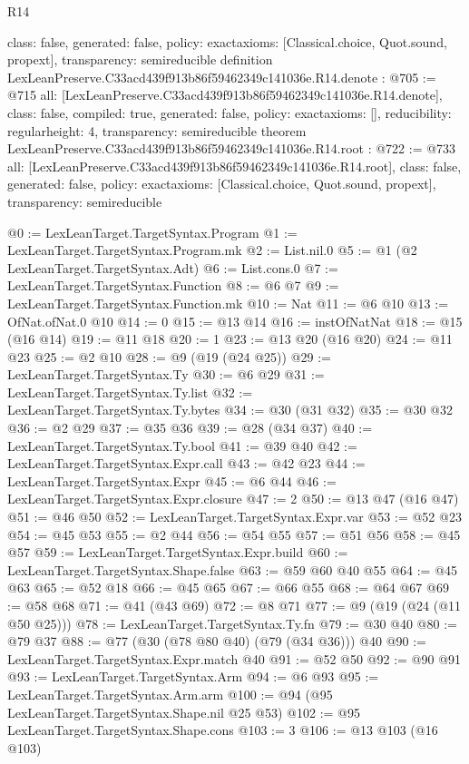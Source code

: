 \begin{lexlean}{R14}
\begin{coremodule}
{  class: false,
  generated: false,
  policy: exact{axioms: [Classical.choice, Quot.sound, propext]},
  transparency: semireducible
}
definition LexLeanPreserve.C33acd439f913b86f59462349c141036e.R14.denote : @705 := @715 {
  all: [LexLeanPreserve.C33acd439f913b86f59462349c141036e.R14.denote],
  class: false,
  compiled: true,
  generated: false,
  policy: exact{axioms: []},
  reducibility: regular{height: 4},
  transparency: semireducible
}
theorem LexLeanPreserve.C33acd439f913b86f59462349c141036e.R14.root : @722 := @733 {
  all: [LexLeanPreserve.C33acd439f913b86f59462349c141036e.R14.root],
  class: false,
  generated: false,
  policy: exact{axioms: [Classical.choice, Quot.sound, propext]},
  transparency: semireducible
}

@0 := LexLeanTarget.TargetSyntax.Program
@1 := LexLeanTarget.TargetSyntax.Program.mk
@2 := List.nil.{0}
@5 := @1 (@2 LexLeanTarget.TargetSyntax.Adt)
@6 := List.cons.{0}
@7 := LexLeanTarget.TargetSyntax.Function
@8 := @6 @7
@9 := LexLeanTarget.TargetSyntax.Function.mk
@10 := Nat
@11 := @6 @10
@13 := OfNat.ofNat.{0} @10
@14 := 0
@15 := @13 @14
@16 := instOfNatNat
@18 := @15 (@16 @14)
@19 := @11 @18
@20 := 1
@23 := @13 @20 (@16 @20)
@24 := @11 @23
@25 := @2 @10
@28 := @9 (@19 (@24 @25))
@29 := LexLeanTarget.TargetSyntax.Ty
@30 := @6 @29
@31 := LexLeanTarget.TargetSyntax.Ty.list
@32 := LexLeanTarget.TargetSyntax.Ty.bytes
@34 := @30 (@31 @32)
@35 := @30 @32
@36 := @2 @29
@37 := @35 @36
@39 := @28 (@34 @37)
@40 := LexLeanTarget.TargetSyntax.Ty.bool
@41 := @39 @40
@42 := LexLeanTarget.TargetSyntax.Expr.call
@43 := @42 @23
@44 := LexLeanTarget.TargetSyntax.Expr
@45 := @6 @44
@46 := LexLeanTarget.TargetSyntax.Expr.closure
@47 := 2
@50 := @13 @47 (@16 @47)
@51 := @46 @50
@52 := LexLeanTarget.TargetSyntax.Expr.var
@53 := @52 @23
@54 := @45 @53
@55 := @2 @44
@56 := @54 @55
@57 := @51 @56
@58 := @45 @57
@59 := LexLeanTarget.TargetSyntax.Expr.build
@60 := LexLeanTarget.TargetSyntax.Shape.false
@63 := @59 @60 @40 @55
@64 := @45 @63
@65 := @52 @18
@66 := @45 @65
@67 := @66 @55
@68 := @64 @67
@69 := @58 @68
@71 := @41 (@43 @69)
@72 := @8 @71
@77 := @9 (@19 (@24 (@11 @50 @25)))
@78 := LexLeanTarget.TargetSyntax.Ty.fn
@79 := @30 @40
@80 := @79 @37
@88 := @77 (@30 (@78 @80 @40) (@79 (@34 @36))) @40
@90 := LexLeanTarget.TargetSyntax.Expr.match @40
@91 := @52 @50
@92 := @90 @91
@93 := LexLeanTarget.TargetSyntax.Arm
@94 := @6 @93
@95 := LexLeanTarget.TargetSyntax.Arm.arm
@100 := @94 (@95 LexLeanTarget.TargetSyntax.Shape.nil @25 @53)
@102 := @95 LexLeanTarget.TargetSyntax.Shape.cons
@103 := 3
@106 := @13 @103 (@16 @103)

\end{coremodule}
\end{lexlean}
